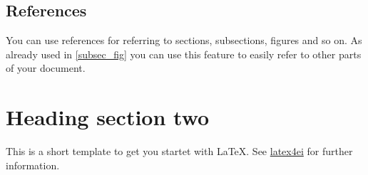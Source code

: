 \documentclass{scrartcl}			%
\begin{document}
\subsection{References}

You can use references for referring to sections, subsections, figures and so on. As already used in \ref{subsec_fig} you can use this feature to easily refer to other parts of your document.

\section{Heading section two}

This is a short template to get you startet with \LaTeX{}. See 
\href{http://www.latex4ei.de/latex#}{latex4ei}
for further information.
\end{document}
